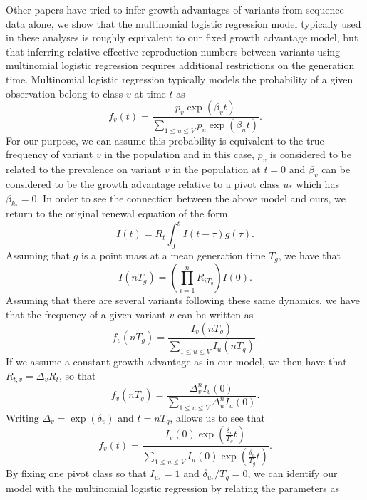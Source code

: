 \documentclass[11pt,oneside,letterpaper]{article}
\begin{document}
Other papers have tried to infer growth advantages of variants from sequence data alone, we show that the multinomial logistic regression model typically used in these analyses is roughly equivalent to our fixed growth advantage model, but that inferring relative effective reproduction numbers between variants using multinomial logistic regression requires additional restrictions on the generation time.
Multinomial logistic regression typically models the probability of a given observation belong to class $v$ at time $t$ as
\begin{equation}
  f_{v}(t) = \frac{p_{v}\exp(\beta_{v} t)}{\sum_{1\leq u\leq V} p_{u}\exp(\beta_{u} t)}.
\end{equation}
For our purpose, we can assume this probability is equivalent to the true frequency of variant $v$ in the population and in this case, $p_{v}$ is considered to be related to the prevalence on variant $v$ in the population at $t=0$ and $\beta_{v}$ can be considered to be the growth advantage relative to a pivot class $u_{*}$ which has $\beta_{k_{*}} = 0$.
In order to see the connection between the above model and ours, we return to the original renewal equation of the form
\begin{equation}
  I(t) = R_{t}\int_{0}^{t} I(t-\tau) g(\tau).
\end{equation}
Assuming that $g$  is a point mass at a mean generation time $T_{g}$, we have that
\begin{equation}
  I(nT_{g}) = \left(\prod_{i=1}^{n} R_{iT_{g}}\right) I(0).
\end{equation}
Assuming that there are several variants following these same dynamics, we have that the frequency of a given variant $v$ can be written as
\begin{equation}
  f_{v}(nT_{g}) = \frac{I_{v}(nT_{g})}{\sum_{1\leq u \leq V} I_{u}(nT_{g})}.
\end{equation}
If we assume a constant growth advantage as in our model, we then have that $R_{t,v} = \Delta_{v} R_{t}$, so that
\begin{equation}
  f_{v}(nT_{g}) =  \frac{\Delta_{v}^{n} I_{v}(0)}{\sum_{1\leq u \leq V} \Delta_{u}^{n} I_{u}(0)}.
\end{equation}
Writing $\Delta_{v} = \exp(\delta_{v})$ and $t = n T_{g}$, allows us to see that
\begin{equation}
  f_{v}(t) = \frac{I_{v}(0) \exp(\frac{\delta_{v}}{T_{g}} t)}{\sum_{1\leq u \leq V}I_{u}(0) \exp(\frac{\delta_{u}}{T_{g}} t)}.
\end{equation}
By fixing one pivot class so that $I_{u_{*}} = 1$ and $\delta_{u_{*}} / T_{g} = 0$, we can identify our model with the multinomial logistic regression by relating the parameters as
\end{document}
